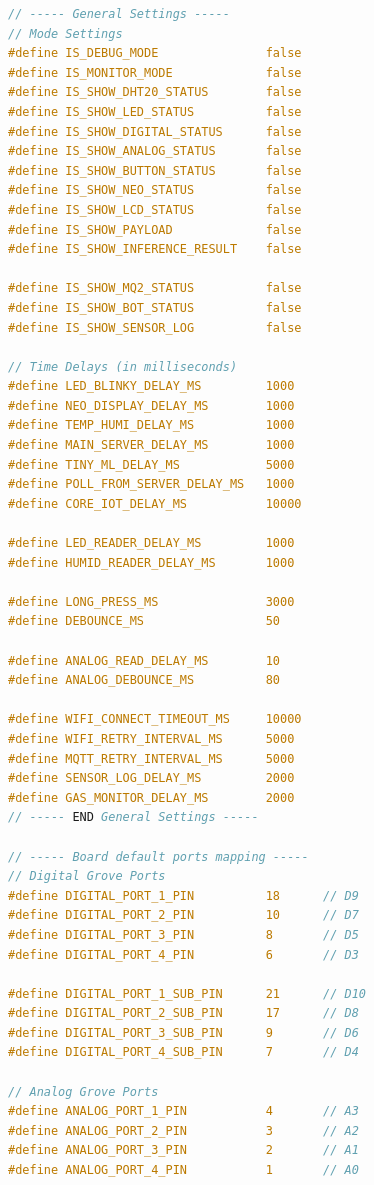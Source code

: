 \begin{lstlisting}[language=C,caption={Excerpt of configuration macros}]
// ----- General Settings -----
// Mode Settings
#define IS_DEBUG_MODE               false
#define IS_MONITOR_MODE             false
#define IS_SHOW_DHT20_STATUS        false
#define IS_SHOW_LED_STATUS          false
#define IS_SHOW_DIGITAL_STATUS      false
#define IS_SHOW_ANALOG_STATUS       false
#define IS_SHOW_BUTTON_STATUS       false
#define IS_SHOW_NEO_STATUS          false
#define IS_SHOW_LCD_STATUS          false
#define IS_SHOW_PAYLOAD             false
#define IS_SHOW_INFERENCE_RESULT    false

#define IS_SHOW_MQ2_STATUS          false
#define IS_SHOW_BOT_STATUS          false
#define IS_SHOW_SENSOR_LOG          false

// Time Delays (in milliseconds)
#define LED_BLINKY_DELAY_MS         1000
#define NEO_DISPLAY_DELAY_MS        1000
#define TEMP_HUMI_DELAY_MS          1000
#define MAIN_SERVER_DELAY_MS        1000
#define TINY_ML_DELAY_MS            5000
#define POLL_FROM_SERVER_DELAY_MS   1000
#define CORE_IOT_DELAY_MS           10000

#define LED_READER_DELAY_MS         1000
#define HUMID_READER_DELAY_MS       1000

#define LONG_PRESS_MS               3000
#define DEBOUNCE_MS                 50

#define ANALOG_READ_DELAY_MS        10
#define ANALOG_DEBOUNCE_MS          80

#define WIFI_CONNECT_TIMEOUT_MS     10000
#define WIFI_RETRY_INTERVAL_MS      5000
#define MQTT_RETRY_INTERVAL_MS      5000
#define SENSOR_LOG_DELAY_MS         2000
#define GAS_MONITOR_DELAY_MS        2000
// ----- END General Settings -----

// ----- Board default ports mapping -----
// Digital Grove Ports
#define DIGITAL_PORT_1_PIN          18      // D9
#define DIGITAL_PORT_2_PIN          10      // D7
#define DIGITAL_PORT_3_PIN          8       // D5
#define DIGITAL_PORT_4_PIN          6       // D3

#define DIGITAL_PORT_1_SUB_PIN      21      // D10
#define DIGITAL_PORT_2_SUB_PIN      17      // D8
#define DIGITAL_PORT_3_SUB_PIN      9       // D6
#define DIGITAL_PORT_4_SUB_PIN      7       // D4

// Analog Grove Ports
#define ANALOG_PORT_1_PIN           4       // A3
#define ANALOG_PORT_2_PIN           3       // A2
#define ANALOG_PORT_3_PIN           2       // A1
#define ANALOG_PORT_4_PIN           1       // A0


\end{lstlisting}
